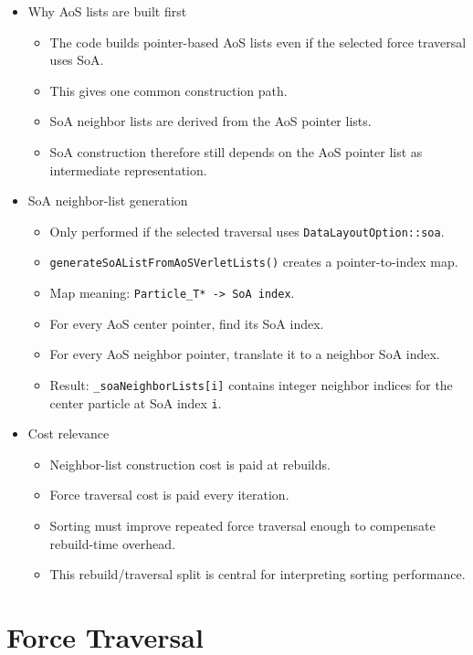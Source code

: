 \begin{itemize}
    \item Why AoS lists are built first
    \begin{itemize}
        \item The code builds pointer-based AoS lists even if the selected force traversal uses SoA.
        \item This gives one common construction path.
        \item SoA neighbor lists are derived from the AoS pointer lists.
        \item SoA construction therefore still depends on the AoS pointer list as intermediate representation.
    \end{itemize}

    \item SoA neighbor-list generation
    \begin{itemize}
        \item Only performed if the selected traversal uses \texttt{DataLayoutOption::soa}.
        \item \texttt{generateSoAListFromAoSVerletLists()} creates a pointer-to-index map.
        \item Map meaning: \texttt{Particle\_T* -> SoA index}.
        \item For every AoS center pointer, find its SoA index.
        \item For every AoS neighbor pointer, translate it to a neighbor SoA index.
        \item Result: \texttt{\_soaNeighborLists[i]} contains integer neighbor indices for the center particle at SoA index \texttt{i}.
    \end{itemize}

    \item Cost relevance
    \begin{itemize}
        \item Neighbor-list construction cost is paid at rebuilds.
        \item Force traversal cost is paid every iteration.
        \item Sorting must improve repeated force traversal enough to compensate rebuild-time overhead.
        \item This rebuild/traversal split is central for interpreting sorting performance.
    \end{itemize}
\end{itemize}

\section{Force Traversal}
\label{sec:baseline_force_traversal}

